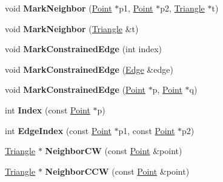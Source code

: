 \begin{DoxyCompactItemize}
\item 
\mbox{\label{classp2t_1_1Triangle_abc085307796eddc8e56a4502244f23e3}} 
void {\bfseries Mark\+Neighbor} (\hyperlink{structp2t_1_1Point}{Point} $\ast$p1, \hyperlink{structp2t_1_1Point}{Point} $\ast$p2, \hyperlink{classp2t_1_1Triangle}{Triangle} $\ast$t)
\item 
\mbox{\label{classp2t_1_1Triangle_a4397122da4abb7940da1f8609973a8f4}} 
void {\bfseries Mark\+Neighbor} (\hyperlink{classp2t_1_1Triangle}{Triangle} \&t)
\item 
\mbox{\label{classp2t_1_1Triangle_a09236b123efc08a1f7300667a9749496}} 
void {\bfseries Mark\+Constrained\+Edge} (int index)
\item 
\mbox{\label{classp2t_1_1Triangle_a40155610e44359717c4689af073bf792}} 
void {\bfseries Mark\+Constrained\+Edge} (\hyperlink{structp2t_1_1Edge}{Edge} \&edge)
\item 
\mbox{\label{classp2t_1_1Triangle_a4eaa58a5b6a62a25911ef23cd489ecff}} 
void {\bfseries Mark\+Constrained\+Edge} (\hyperlink{structp2t_1_1Point}{Point} $\ast$p, \hyperlink{structp2t_1_1Point}{Point} $\ast$q)
\item 
\mbox{\label{classp2t_1_1Triangle_a0215092bb64e831308bf5fcefd065337}} 
int {\bfseries Index} (const \hyperlink{structp2t_1_1Point}{Point} $\ast$p)
\item 
\mbox{\label{classp2t_1_1Triangle_ad63ce0b5e1642a0905f75863720b0f24}} 
int {\bfseries Edge\+Index} (const \hyperlink{structp2t_1_1Point}{Point} $\ast$p1, const \hyperlink{structp2t_1_1Point}{Point} $\ast$p2)
\item 
\mbox{\label{classp2t_1_1Triangle_aa3d2f339d3d01a50b45db7a0bca3c378}} 
\hyperlink{classp2t_1_1Triangle}{Triangle} $\ast$ {\bfseries Neighbor\+CW} (const \hyperlink{structp2t_1_1Point}{Point} \&point)
\item 
\mbox{\label{classp2t_1_1Triangle_a1c58c9118f15765a049c116f5b240ce7}} 
\hyperlink{classp2t_1_1Triangle}{Triangle} $\ast$ {\bfseries Neighbor\+C\+CW} (const \hyperlink{structp2t_1_1Point}{Point} \&point)

\end{DoxyCompactItemize}
